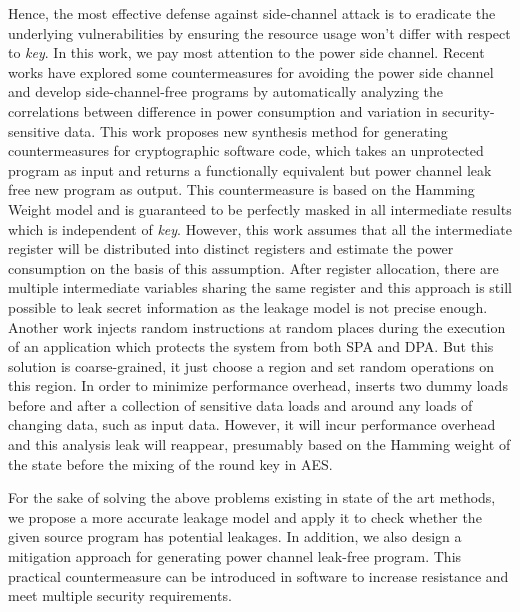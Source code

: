 \documentclass[10pt, conference]{IEEEtran}
\begin{document}
    Hence, the most effective defense against side-channel attack is to eradicate the underlying vulnerabilities by ensuring the resource usage won't differ with respect to \emph{key}. In this work, we pay most attention to the power side channel. Recent works have explored some countermeasures for avoiding the power side channel and develop side-channel-free programs by automatically analyzing the correlations between difference in power consumption and variation in security-sensitive data. This work\cite{eldib2014synthesis} proposes new synthesis method for generating countermeasures for cryptographic software code, which takes an unprotected program as input and returns a functionally equivalent but power channel leak free new program as output. This countermeasure is based on the Hamming Weight model and is guaranteed to be perfectly masked in all intermediate results which is independent of \emph{key}. However, this work assumes that all the intermediate register will be distributed into distinct registers and estimate the power consumption on the basis of this assumption. After register allocation, there are multiple intermediate variables sharing the same register and this approach is still possible to leak secret information as the leakage model is not precise enough. Another work\cite{ambrose2007rijid} injects random instructions at random places during the execution of an application which protects the system from both SPA and DPA. But this solution is coarse-grained, it just choose a region and set random operations on this region. In order to minimize performance overhead, \cite{saab2016side} inserts two dummy loads before and after a collection of sensitive data loads and around any loads of changing data, such as input data. However, it will incur performance overhead and this analysis leak will reappear, presumably based on the Hamming weight of the state before the mixing of the round key in AES.

For the sake of solving the above problems existing in state of the art methods, we propose a more accurate leakage model and apply it to check whether the given source program has potential leakages. In addition, we also design a mitigation approach for generating power channel leak-free program. This practical countermeasure can be introduced in software to increase resistance and meet multiple security requirements. 
\end{document}

